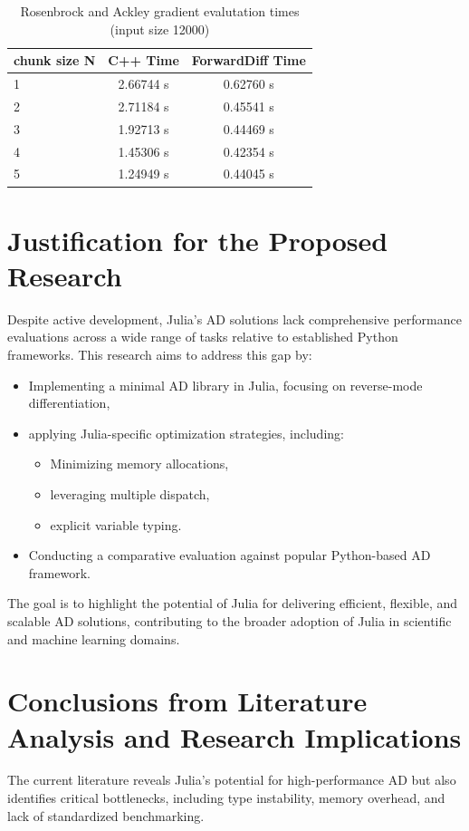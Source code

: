 \documentclass[conference]{IEEEtran}
\begin{document}
\begin{table}[ht]
    \caption{Rosenbrock and Ackley gradient evalutation times (input size 12000) \cite{b1}}
    \centering
    \scriptsize
    \begin{tabular}{lcc}
    \hline
    \textbf{chunk size N} & \textbf{C++ Time} & \textbf{ForwardDiff Time} \\
    \hline
    1 & 2.66744 s & 0.62760 s \\
    2 & 2.71184 s & 0.45541 s \\
    3 & 1.92713 s & 0.44469 s \\
    4 & 1.45306 s & 0.42354 s \\
    5 & 1.24949 s & 0.44045 s \\
    \hline
    \end{tabular}
    \label{tab:comparison}
\end{table}

\section{Justification for the Proposed Research}
Despite active development, Julia's AD solutions lack comprehensive performance
evaluations across a wide range of tasks relative to established Python frameworks.
This research aims to address this gap by:
\begin{itemize}
    \item Implementing a minimal AD library in Julia, focusing on reverse-mode differentiation,
    \item applying Julia-specific optimization strategies, including:
    \begin{itemize}
        \item Minimizing memory allocations,
        \item leveraging multiple dispatch,
        \item explicit variable typing.
    \end{itemize}
    \item Conducting a comparative evaluation against popular Python-based AD framework.
\end{itemize}
The goal is to highlight the potential of Julia for delivering efficient, flexible,
and scalable AD solutions, contributing to the broader adoption of Julia in scientific
and machine learning domains.

\section{Conclusions from Literature Analysis and Research Implications}
The current literature reveals Julia's potential for high-performance AD but 
also identifies critical bottlenecks, including type instability, memory overhead, 
and lack of standardized benchmarking.
\end{document}
